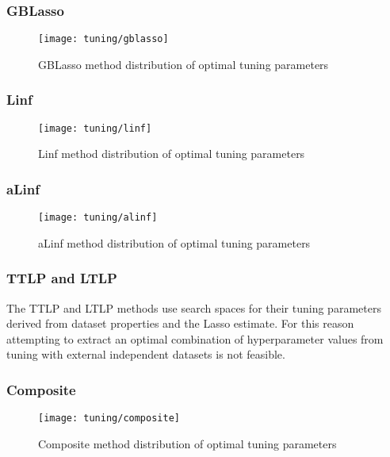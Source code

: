 \subsubsection{GBLasso}
\begin{figure}[H]
	\centering
	\texttt{[image: tuning/gblasso]}
	\caption{GBLasso method distribution of optimal tuning parameters}
	\label{fig:tun_gblasso}
\end{figure}

\subsubsection{Linf}
\begin{figure}[H]
	\centering
	\texttt{[image: tuning/linf]}
	\caption{Linf method distribution of optimal tuning parameters}
	\label{fig:tun_linf}
\end{figure}

\subsubsection{aLinf}
\begin{figure}[H]
	\centering
	\texttt{[image: tuning/alinf]}
	\caption{aLinf method distribution of optimal tuning parameters}
	\label{fig:tun_alinf}
\end{figure}

\subsubsection{TTLP and LTLP}
The TTLP and LTLP methods use search spaces for their tuning parameters derived from dataset properties and the Lasso estimate. For this reason attempting to extract an optimal combination of hyperparameter values from tuning with external independent datasets is not feasible. 

\subsubsection{Composite}
\begin{figure}[H]
	\centering
	\texttt{[image: tuning/composite]}
	\caption{Composite method distribution of optimal tuning parameters}
	\label{fig:tun_composite}
\end{figure}
